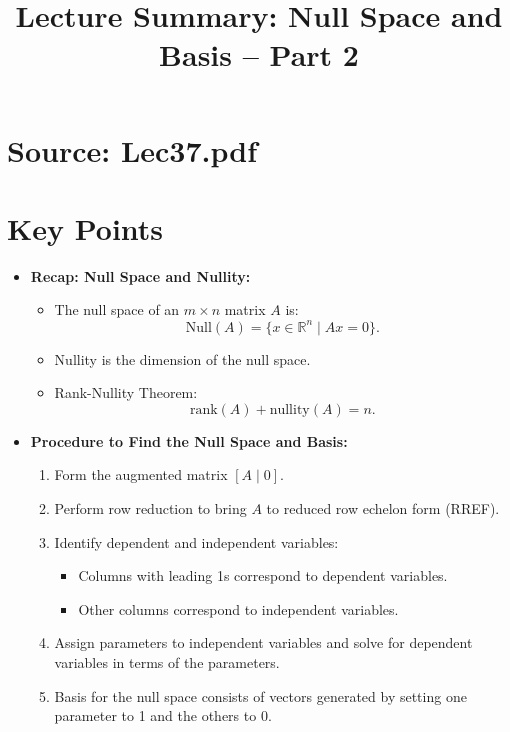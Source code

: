 \documentclass{article}
\title{Lecture Summary: Null Space and Basis – Part 2}
\author{}
\date{}
\begin{document}
\maketitle

\section*{Source: Lec37.pdf}

\section*{Key Points}

\begin{itemize}
  \item \textbf{Recap: Null Space and Nullity:}
    \begin{itemize}
      \item The null space of an $m \times n$ matrix $A$ is:
        \[
          \text{Null}(A) = \{x \in \mathbb{R}^n \mid Ax = 0\}.
        \]
      \item Nullity is the dimension of the null space.
      \item Rank-Nullity Theorem:
        \[
          \text{rank}(A) + \text{nullity}(A) = n.
        \]
    \end{itemize}

  \item \textbf{Procedure to Find the Null Space and Basis:}
    \begin{enumerate}
      \item Form the augmented matrix $[A \mid 0]$.
      \item Perform row reduction to bring $A$ to reduced row echelon form (RREF).
      \item Identify dependent and independent variables:
        \begin{itemize}
          \item Columns with leading 1s correspond to dependent variables.
          \item Other columns correspond to independent variables.
        \end{itemize}
      \item Assign parameters to independent variables and solve for dependent variables in terms of the parameters.
      \item Basis for the null space consists of vectors generated by setting one parameter to 1 and the others to 0.
    \end{enumerate}


\end{itemize}
\end{document}
